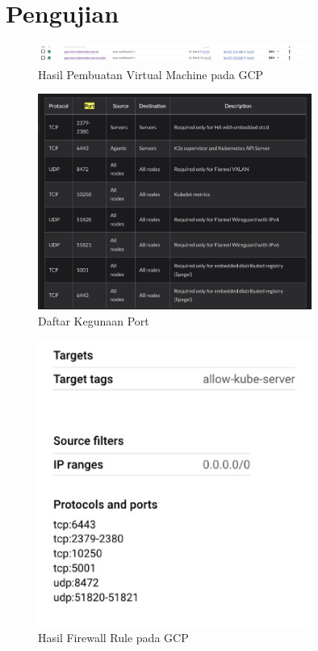 \chapter{Pengujian}

\begin{figure}[ht]
  \centering
  \includegraphics[width=0.8\textwidth]{resources/chapter-4/pengujian/kube-gcp-01.jpg}
  \caption{Hasil Pembuatan Virtual Machine pada GCP}
  \label{fig:hasil-pembuatan-virtual-machine-gcp}
\end{figure}

\begin{figure}[ht]
  \centering
  \includegraphics[width=0.8\textwidth]{resources/chapter-4/pengujian/kube-gcp-03.jpg}
  \caption{Daftar Kegunaan Port}
  \label{fig:daftar-kegunaan-port}
\end{figure}

\begin{figure}[ht]
  \centering
  \includegraphics[width=0.8\textwidth]{resources/chapter-4/pengujian/kube-gcp-02.jpg}
  \caption{Hasil Firewall Rule pada GCP}
  \label{fig:hasil-firewall-rule-pada-gcp}
\end{figure}

